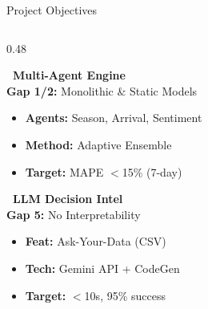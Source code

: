 \documentclass{beamer}
\begin{document}
\begin{frame}[label=objectives]{Project Objectives}

\vspace{0.1cm}

\begin{columns}[T]
\begin{column}{0.48\textwidth}
\begin{tcolorbox}[enhanced, colback=primaryblue!3, colframe=gray!15,
  boxrule=0.4pt, arc=4pt, shadow={1pt}{-1pt}{0pt}{black!15},
  borderline west={3pt}{0pt}{accentblue},
  left=5pt, right=5pt, top=4pt, bottom=4pt]
\scriptsize
{\color{primaryblue}\bfseries\normalsize {}~Multi-Agent Engine}\\[2pt]
{\color{black!60}\textbf{Gap 1/2:} Monolithic \& Static Models}
\vspace{0.04cm}
\begin{itemize}\setlength\itemsep{1pt}
\item[\color{primaryblue}\faAngleRight] \textbf{Agents:} Season, Arrival, Sentiment
\item[\color{primaryblue}\faAngleRight] \textbf{Method:} Adaptive Ensemble
\item[\color{primaryblue}\faAngleRight] \textbf{Target:} MAPE $<$15\% (7-day)
\end{itemize}
\end{tcolorbox}

\vspace{0.08cm}

\begin{tcolorbox}[enhanced, colback=accentpurple!3, colframe=gray!15,
  boxrule=0.4pt, arc=4pt, shadow={1pt}{-1pt}{0pt}{black!15},
  borderline west={3pt}{0pt}{accentpurple},
  left=5pt, right=5pt, top=4pt, bottom=4pt]
\scriptsize
{\color{accentpurple}\bfseries\normalsize {}~LLM Decision Intel}\\[2pt]
{\color{black!60}\textbf{Gap 5:} No Interpretability}
\vspace{0.04cm}
\begin{itemize}\setlength\itemsep{1pt}
\item[\color{accentpurple}\faAngleRight] \textbf{Feat:} Ask-Your-Data (CSV)
\item[\color{accentpurple}\faAngleRight] \textbf{Tech:} Gemini API + CodeGen
\item[\color{accentpurple}\faAngleRight] \textbf{Target:} $<$10s, 95\% success
\end{itemize}
\end{tcolorbox}
\end{column}


\end{columns}
\end{frame}
\end{document}
